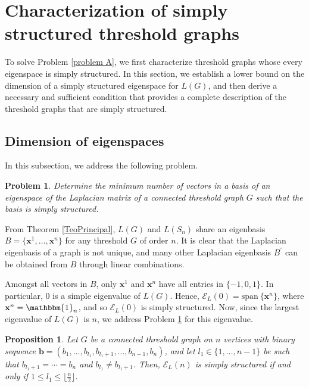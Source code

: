 \documentclass[preprint]{elsarticle}
\newtheorem{proposition}[theorem]{Proposition}
\newtheorem{problem}{Problem}
\begin{document}
\section{Characterization of simply structured threshold graphs}
\label{sec:3}

To solve Problem \ref{problem A}, we first characterize threshold graphs whose every eigenspace is simply structured. In this section, we establish a lower bound on the dimension of a  simply structured eigenspace for $L(G)$, and then derive a necessary and sufficient condition that provides a complete description of the threshold graphs that are simply structured.


\subsection{Dimension of eigenspaces}


 In this subsection, we address the following problem.%

\vspace{0.3cm}

\begin{problem}\label{problema A1}
    Determine the minimum number of vectors in a basis of an eigenspace of the Laplacian matrix of a connected threshold graph $G$ such that the basis is simply structured.
\end{problem}

\vspace{0.3cm}

From Theorem \ref{TeoPrincipal}, $L(G)$ and $L(S_n)$ share an eigenbasis $B=\{\mathbf{x}^{1},\ldots,\mathbf{x}^{n}\}$ for any threshold $G$ of order $n$. It is clear that the Laplacian eigenbasis of a graph is not unique, and many  other Laplacian eigenbasis $B^{\prime}$ can be obtained from $B$ through linear combinations.

Amongst all vectors in $B$, only $\mathbf{x}^{1}$ and $\mathbf{x}^{n}$ have all entries in $\{-1,0,1\}$. In particular, $0$ is a simple eigenvalue of $L(G)$. Hence, $\mathcal{E}_{L}(0)=\mathrm{span} \ \{ \mathbf{x}^{n}\}$, where $\mathbf{x}^{n} = \mathbbm{1}_n$, and so $\mathcal{E}_{L}(0)$ is simply structured. Now, since the largest eigenvalue of $L(G)$ is $n$, we address Problem \ref{problema A1} for this eigenvalue. 

\begin{proposition}\label{prop:n}
    Let $G$ be a connected threshold graph on $n$ vertices with binary sequence $\mathbf{b}=(b_1, \ldots, b_{l_1}, b_{l_1+1}, \ldots, b_{n-1}, b_n)$, and let $l_1 \in \{1,\ldots,n-1\}$ be such that $b_{l_1+1} = \cdots = b_{n}$ and  $b_{l_1}\neq b_{l_1+1}$. Then, $\mathcal{E}_L(n)$ is simply structured if and only if $1\leq l_1 \leq \lfloor \frac{n}{2} \rfloor.$
\end{proposition}
\end{document}
